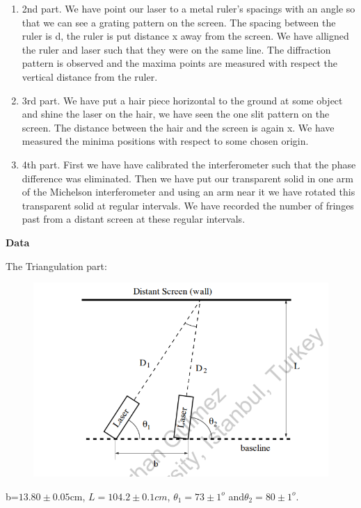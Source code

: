 \documentclass[10pt,a4paper]{article}
\begin{document}
{\begin{enumerate}
	\item 2nd part. We have point our laser to a metal ruler's spacings with an angle so that we can see a grating pattern on the screen. The spacing between the ruler is d, the ruler is put distance x away from the screen. We have alligned the ruler and laser such that they were on the same line. The diffraction pattern is observed and the maxima points are measured with respect the vertical distance from the ruler.
    \item 3rd part. We have put a hair piece horizontal to the ground at some object and shine the laser on the hair, we have seen the one slit pattern on the screen. The distance between the hair and the screen is again x. We have measured the minima positions with respect to some chosen origin.
    \item 4th part. First we have have calibrated the interferometer such that the phase difference was eliminated. Then we have put our transparent solid in one arm of the Michelson interferometer and using an arm near it we have rotated this transparent solid at regular intervals. We have recorded the number of fringes past from a distant screen at these regular intervals.
\end{enumerate}
\textbf{Data}\\[\baselineskip]
\par The Triangulation part:
\begin{figure}[H]
	\begin{center}
		\includegraphics[scale=0.75]{Tri.png}
	\end{center}
\end{figure}
\par b=$13.80\pm0.05$cm, $L=104.2\pm0.1cm$, $\theta_1=73\pm1^o$ and$\theta_2=80\pm1^o$.
}
\end{document}
